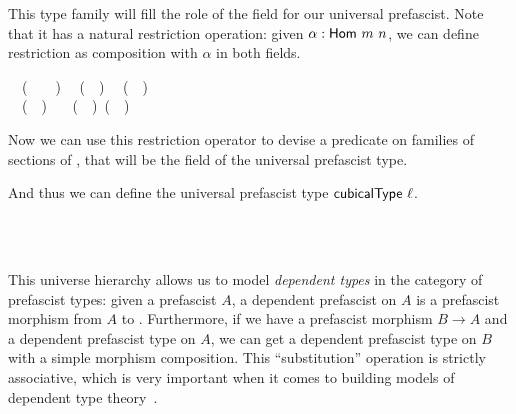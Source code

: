 This type family will fill the role of the field  for our universal 
prefascist.
% 
Note that it has a natural restriction operation: given \( \alpha : \func{Hom}~m~n \), 
we can define restriction as composition with \( \alpha \) in both fields.
% 
% 
\begin{code}
\>[0]~\AgdaSymbol{:}~(~\AgdaSymbol{:}~~~)~%
~(~~)~%
~(~~)\<%
\\
\>[0]~~(~~)~%
\AgdaSymbol{=}~~(~~)~(~~)\<%
\end{code}

Now we can use this restriction operator to devise a predicate  
on families of sections of , that will be the field  of the 
universal prefascist type.


And thus we can define the universal prefascist type \( \func{cubicalType}~\ell \).
% 
\begin{code}
\>[0]~\AgdaSymbol{:}~~~~\<%
\\
\>[0]~\AgdaBound{\ell}~%
\AgdaSymbol{=}~\AgdaSymbol{\{}~~\AgdaSymbol{=}~~~\AgdaSymbol{;}~%
~\AgdaSymbol{=}~~\AgdaSymbol{\}}\<%
\end{code}

This universe hierarchy allows us to model \emph{dependent types} in the 
category of prefascist types: given a prefascist \( A \), a dependent prefascist
on \( A \) is a prefascist morphism from \( A \) to .
% 
Furthermore, if we have a prefascist morphism \( B \to A \) and a dependent prefascist type
on \( A \), we can get a dependent prefascist type on \( B \) with a simple 
morphism composition.
% 
This ``substitution'' operation is strictly associative, which is very important when it
comes to building models of dependent type theory~.

